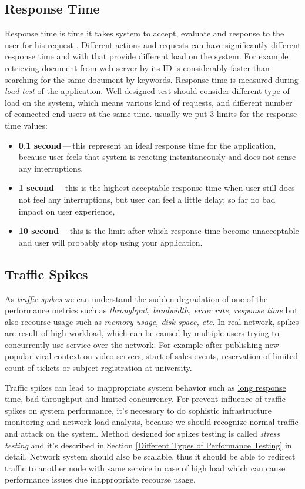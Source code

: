 \subsection{Response Time}
Response time is time it takes system to accept, evaluate and response to the user for his request . Different actions and requests can have significantly different response time and with that provide different load on the system. For example retrieving document from web-server by its ID is considerably faster than searching for the same document by keywords. Response time is measured during \emph{load test} \cite{Manzor:APTB} of the application. Well designed test should consider different type of load on the system, which means various kind of requests, and different 
number of connected end-users at the same time. usually we put 3 limits for the response time values: 

\begin{itemize}
	\setlength\itemsep{0em}
	\item \textbf{0.1 second}\,---\,this represent an ideal response time for the application, because user feels that system is reacting instantaneously and does not sense any interruptions,
	\item \textbf{1 second}\,---\,this is the highest acceptable response time when user still does not feel any interruptions, but user can feel a little delay; so far no bad impact on user experience,
	\item \textbf{10 second}\,---\,this is the limit after which response time become unacceptable and user will probably stop using your application.
\end{itemize}

\subsection{Traffic Spikes}
As \emph{traffic spikes} \cite{Kurkova:Thesis:2017, AMC:SPIKES} we can understand the sudden degradation of one of the performance metrics such as \emph{throughput, bandwidth, error rate, response time} but also recourse usage such as \emph{memory usage, disk space, etc.} In real network, spikes are result of high workload, which can be caused by multiple users trying to concurrently use service over the network. For example after publishing new popular viral context on video servers, start of sales events, reservation of limited count of tickets or subject registration at university.

Traffic spikes can lead to inappropriate system behavior such as \underline{long response time}, \underline{bad throughput} and \underline{limited concurrency}. For prevent influence of traffic spikes on system performance, it's  necessary to do sophistic infrastructure monitoring and network load analysis, because we should recognize normal traffic and attack on the system. Method designed for spikes testing is called \emph{stress testing} \cite{Manzor:APTB} and it's described in Section \ref{Different Types of Performance Testing} in detail. Network system should also be scalable, thus it should be able to redirect traffic to another node with same service in case of high load which can cause performance issues due inappropriate recourse usage.

